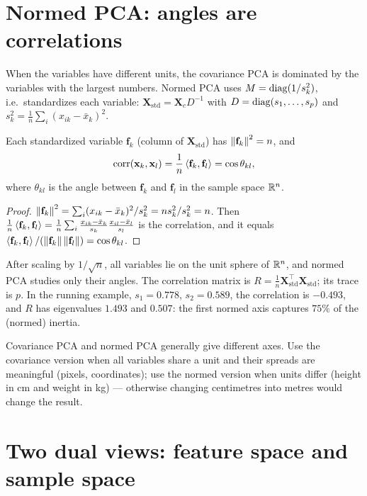 \begin{notechapter}
\section{Normed PCA: angles are correlations}\label{pca-overview:sec:normed}

When the variables have different units, the covariance PCA is dominated by the variables with
the largest numbers. Normed PCA uses $M = \operatorname{diag}(1/s_k^2)$, i.e.\ standardizes each variable:
$\mathbf X_{\text{std}} = \mathbf X_cD^{-1}$ with $D = \operatorname{diag}(s_1,\dots,s_p)$ and $s_k^2 = \frac1n\sum_i(x_{ik} - \bar x_k)^2$.

\begin{proposition}\label{pca-overview:prop:cosine}
Each standardized variable $\mathbf f_k$ (column of $\mathbf X_{\text{std}}$) has $\left\|\mathbf f_k\right\|^2 = n$, and
\[
  \mathrm{corr}(\mathbf x_k,\mathbf x_l) = \frac1n\left\langle \mathbf f_k, \mathbf f_l \right\rangle = \cos\theta_{kl},
\]
where $\theta_{kl}$ is the angle between $\mathbf f_k$ and $\mathbf f_l$ in the sample space $\mathbb{R}^n$.
\end{proposition}

\begin{proof}
$\left\|\mathbf f_k\right\|^2 = \sum_i(x_{ik} - \bar x_k)^2/s_k^2 = ns_k^2/s_k^2 = n$. Then
$\frac1n\left\langle \mathbf f_k, \mathbf f_l \right\rangle = \frac1n\sum_i\frac{x_{ik} - \bar x_k}{s_k}\frac{x_{il} - \bar x_l}{s_l}$ is the correlation,
and it equals $\left\langle \mathbf f_k, \mathbf f_l \right\rangle/(\left\|\mathbf f_k\right\|\left\|\mathbf f_l\right\|) = \cos\theta_{kl}$.
\end{proof}

After scaling by $1/\sqrt n$, all variables lie on the unit sphere of $\mathbb{R}^n$, and normed PCA studies
only their angles. The correlation matrix is $R = \frac1n\mathbf X_{\text{std}}^\top\mathbf X_{\text{std}}$; its trace is $p$.
In the running example, $s_1 = 0.778$, $s_2 = 0.589$, the correlation is $-0.493$, and $R$ has
eigenvalues $1.493$ and $0.507$: the first normed axis captures $75\%$ of the (normed) inertia.

\begin{pitfall}
Covariance PCA and normed PCA generally give different axes. Use the covariance version when all
variables share a unit and their spreads are meaningful (pixels, coordinates); use the normed version
when units differ (height in cm and weight in kg) --- otherwise changing centimetres into metres
would change the result.
\end{pitfall}

\section{Two dual views: feature space and sample space}\label{pca-overview:sec:duality}


\end{notechapter}
